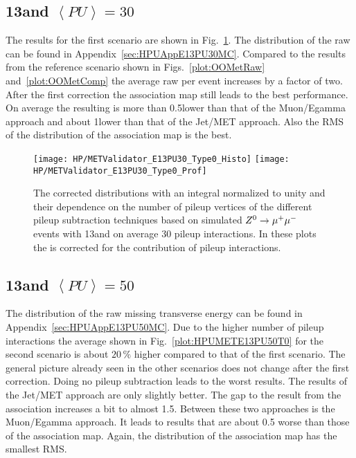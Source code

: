 \subsection{13\TeV and $\left<PU\right> =30$ \label{sec:HPUMETE13PU30}}

The results for the first scenario are shown in Fig.~\ref{plot:HPUMETE13PU30T0}. The distribution of the raw \MET{} can be found in Appendix~\ref{sec:HPUAppE13PU30MC}. Compared to the results from the reference scenario shown in Figs.~\ref{plot:OOMetRaw} and~\ref{plot:OOMetComp} the average raw \MET{} per event increases by a factor of two. After the first correction the association map still leads to the best performance. On average the resulting \MET{} is more than 0.5\GeV lower than that of the Muon/Egamma approach and about 1\GeV lower than that of the Jet/MET approach. Also the RMS of the distribution of the association map is the best.

\begin{figure}[Ht]
  \centering
  \texttt{[image: HP/METValidator\_E13PU30\_Type0\_Histo]}
  \texttt{[image: HP/METValidator\_E13PU30\_Type0\_Prof]}
  \caption[The corrected \MET{} distributions and their dependence on the number of pileup vertices for different pileup subtraction techniques based on simulated  $\Zz\rightarrow\MM$ events with 13\TeV and $\left<PU\right>=30$]{The corrected \MET{} distributions with an integral normalized to unity and their dependence on the number of pileup vertices of the different pileup subtraction techniques based on simulated  $\Zz\rightarrow\MM$ events with 13\TeV and on average 30 pileup interactions. In these plots the \MET{} is corrected for the contribution of pileup interactions. \label{plot:HPUMETE13PU30T0}}
\end{figure}

\subsection{13\TeV and $\left<PU\right> =50$ \label{sec:HPUMETE13PU50}}

The distribution of the raw missing transverse energy can be found in Appendix~\ref{sec:HPUAppE13PU50MC}. Due to the higher number of pileup interactions the average \MET{} shown in Fig.~\ref{plot:HPUMETE13PU50T0} for the second scenario is about $20\,\%$ higher compared to that of the first scenario. The general picture already seen in the other scenarios does not change after the first correction. Doing no pileup subtraction leads to the worst results. The results of the Jet/MET approach are only slightly better. The gap to the result from the association increases a bit to almost 1.5\GeV{}. Between these two approaches is the Muon/Egamma approach. It leads to results that are about 0.5\GeV{} worse than those of the association map. Again, the distribution of the association map has the smallest RMS.

